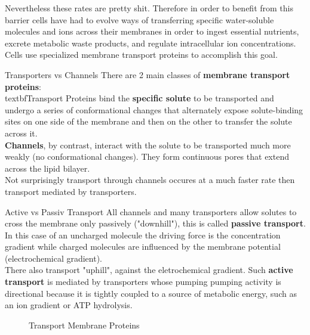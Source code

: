 \documentclass[../main.tex]{subfiles}
\begin{document}
Nevertheless these rates are pretty shit. Therefore in order to benefit from this barrier cells have had to evolve ways of transferring specific water-soluble molecules and ions across their membranes in order to ingest essential nutrients, excrete metabolic waste products, and regulate intracellular ion concentrations. Cells use specialized membrane transport proteins to accomplish this goal. 
\begin{RemarkWithTitel}{Transporters vs Channels}
	There are 2 main classes of \textbf{membrane transport proteins}:  \\
	textbf{Transport Proteins} bind the \textbf{specific solute} to be transported and undergo a series of conformational changes that alternately expose solute-binding sites on one side of the membrane and then on the other to transfer the solute across it.\\
	\textbf{Channels}, by contrast, interact with the solute to be transported much more weakly (no conformational changes). They form continuous pores that extend across the lipid bilayer.\\
	Not surprisingly transport through channels occures at a much faster rate then transport mediated by transporters.
\end{RemarkWithTitel}
\begin{RemarkWithTitel}{Active vs Passiv Transport}
	All channels and many transporters allow solutes to cross the membrane only passively ("downhill"), this is called \textbf{passive transport}. In this case of an uncharged molecule the driving force is the concentration gradient while charged molecules are influenced by the membrane potential (electrochemical gradient). \\
	There also transport "uphill", against the eletrochemical gradient. Such \textbf{active transport} is mediated by transporters whose pumping pumping activity is directional because it is tightly coupled to a source of metabolic energy, such as an ion gradient or ATP hydrolysis. 
\end{RemarkWithTitel} 
\begin{figure}[H]
	\centering
	\caption{Transport Membrane Proteins}
\end{figure}
\end{document}
